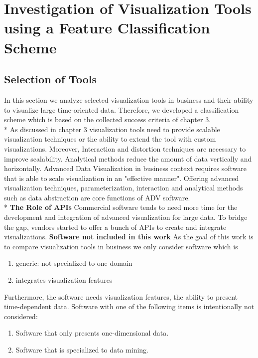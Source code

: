 \chapter{Investigation of Visualization Tools using a Feature Classification Scheme}
\label{chap:Tools}

\section{Selection of Tools}
In this section we analyze selected visualization tools in business and their ability to visualize large time-oriented data. Therefore, we developed a classification scheme which is based on the collected success criteria of chapter 3. \\*
As discussed in chapter 3 visualization tools need to provide scalable visualization techniques or the ability to extend the tool with custom visualizations. Moreover, Interaction and distortion techniques are necessary to improve scalability. Analytical methods reduce the amount of data vertically and horizontally. 
Advanced Data Visualization in business context requires software that is able to scale visualization in an "effective manner"\cite{Russom2011}. Offering advanced visualization techniques, parameterization, interaction and analytical methods such as data abstraction\cite{Tegarden1999,Aigner2011,Eick2002,Zhanga} are core functions of ADV software. \\*
\textbf{The Role of APIs}
Commercial software tends to need more time for the development and integration of advanced visualization for large data\cite{Zhanga, Simon2014}. To bridge the gap, vendors started to offer a bunch of APIs to create and integrate visualizations. 
\textbf{Software not included in this work}
As the goal of this work is to compare visualization tools in business we only consider software which is 
\begin{enumerate}
    \item generic: not specialized to one domain
    \item integrates visualization features
\end{enumerate}

Furthermore, the software needs visualization features, the ability to present time-dependent data. Software with one of the following items is intentionally not considered: 
\begin{enumerate}
    \item Software that only presents one-dimensional data. 
    \item Software that is specialized to data mining.
\end{enumerate}

